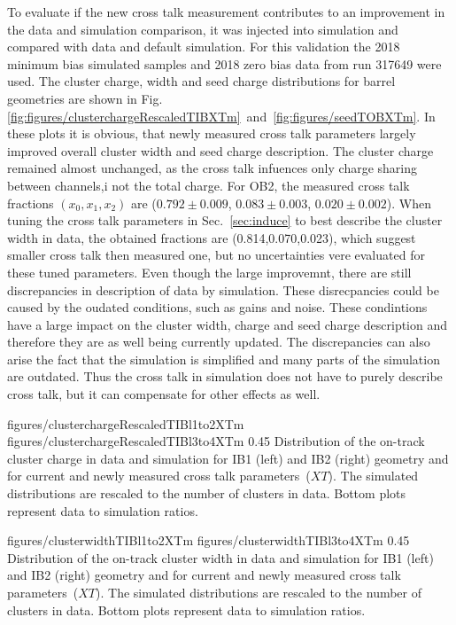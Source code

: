 To evaluate if the new cross talk measurement contributes to an improvement in the data and simulation comparison, it was injected into simulation and compared with data and default simulation. For this validation the 2018 minimum bias simulated samples and 2018 zero bias data from run 317649 were used. The cluster charge, width and seed charge distributions for barrel geometries are shown in Fig.\ref{fig:figures/clusterchargeRescaledTIBXTm}~and~\ref{fig:figures/seedTOBXTm}. In these plots it is obvious, that newly measured cross talk parameters largely improved overall cluster width and seed charge description. The cluster charge remained almost unchanged, as the cross talk infuences only charge sharing between channels,i not the total charge.  For OB2, the measured cross talk fractions $(x_{0}, x_{1}, x_{2})$ are ($0.792 \pm 0.009 $, $0.083 \pm 0.003 $, $0.020 \pm 0.002$). When tuning the cross talk parameters in Sec.~\ref{sec:induce} to best describe the cluster width in data, the obtained fractions are (0.814,0.070,0.023), which suggest smaller cross talk then measured one, but no uncertainties vere evaluated for these tuned parameters. Even though the large improvemnt, there are still discrepancies in description of data by simulation. These disrecpancies could be caused by the oudated conditions, such as gains and noise. These condintions have a large impact on the cluster width, charge and seed charge description and therefore they are as well being currently updated. The discrepancies can also arise the fact that the simulation is simplified and many parts of the simulation are outdated. Thus the cross talk in simulation does not have to purely describe cross talk, but it can compensate for other effects as well. 


                 {figures/clusterchargeRescaledTIBl1to2XTm} %
                 {figures/clusterchargeRescaledTIBl3to4XTm} %
                 {0.45}       %
                 { Distribution of the on-track cluster charge in data and simulation for IB1 (left) and IB2 (right) geometry and for current and newly measured cross talk parameters~($XT$).  The simulated distributions are rescaled to the number of clusters in data.  Bottom plots represent data to simulation ratios. }

                 {figures/clusterwidthTIBl1to2XTm}
                 {figures/clusterwidthTIBl3to4XTm}
                 {0.45}       %
                 { Distribution of the on-track cluster width in data and simulation for IB1 (left) and IB2 (right) geometry and for current and newly measured cross talk parameters~($XT$).  The simulated distributions are rescaled to the number of clusters in data.  Bottom plots represent data to simulation ratios. }

